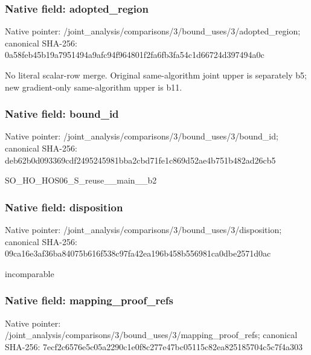\documentclass[10pt,a4paper]{article}
\begin{document}
\subsubsection{Native field: adopted\_\allowbreak{}region}
Native pointer: /joint\_\allowbreak{}analysis/comparisons/3/bound\_\allowbreak{}uses/3/adopted\_\allowbreak{}region; canonical SHA-256: 0a58feb45b19a7951494a9afc94f964801f2fa6fb3fa54c1d66724d397494a0c

\begingroup\raggedright\sloppy No literal scalar-row merge. Original same-algorithm joint upper is separately b5;\allowbreak{} new gradient-only same-algorithm upper is b11.\par\endgroup

\subsubsection{Native field: bound\_\allowbreak{}id}
Native pointer: /joint\_\allowbreak{}analysis/comparisons/3/bound\_\allowbreak{}uses/3/bound\_\allowbreak{}id; canonical SHA-256: deb62b0d093369cdf2495245981bba2cbd71fe1c869d52ae4b751b482ad26cb5

\begingroup\raggedright\sloppy SO\_\allowbreak{}HO\_\allowbreak{}HOS06\_\allowbreak{}S\_\allowbreak{}reuse\_\allowbreak{}\_\allowbreak{}main\_\allowbreak{}\_\allowbreak{}b2\par\endgroup

\subsubsection{Native field: disposition}
Native pointer: /joint\_\allowbreak{}analysis/comparisons/3/bound\_\allowbreak{}uses/3/disposition; canonical SHA-256: 09ca16e3af36ba84075b616f538c97fa42ea196b458b556981ca0dbe2571d0ac

\begingroup\raggedright\sloppy incomparable\par\endgroup

\subsubsection{Native field: mapping\_\allowbreak{}proof\_\allowbreak{}refs}
Native pointer: /joint\_\allowbreak{}analysis/comparisons/3/bound\_\allowbreak{}uses/3/mapping\_\allowbreak{}proof\_\allowbreak{}refs; canonical SHA-256: 7ecf2c6576e5c05a2290c1e0f8c277e47bc05115c82ea825185704c5c7f4a303
\end{document}
